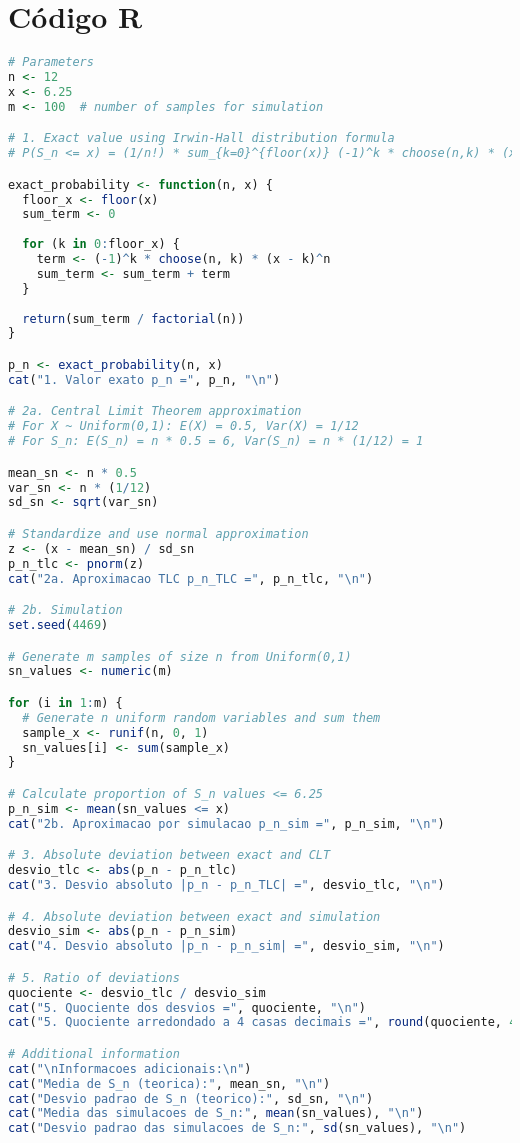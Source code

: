 \documentclass[11pt,a4paper]{article}
\begin{document}
\section*{Código R}

\begin{lstlisting}[language=R]
# Parameters
n <- 12
x <- 6.25
m <- 100  # number of samples for simulation

# 1. Exact value using Irwin-Hall distribution formula
# P(S_n <= x) = (1/n!) * sum_{k=0}^{floor(x)} (-1)^k * choose(n,k) * (x-k)^n

exact_probability <- function(n, x) {
  floor_x <- floor(x)
  sum_term <- 0
  
  for (k in 0:floor_x) {
    term <- (-1)^k * choose(n, k) * (x - k)^n
    sum_term <- sum_term + term
  }
  
  return(sum_term / factorial(n))
}

p_n <- exact_probability(n, x)
cat("1. Valor exato p_n =", p_n, "\n")

# 2a. Central Limit Theorem approximation
# For X ~ Uniform(0,1): E(X) = 0.5, Var(X) = 1/12
# For S_n: E(S_n) = n * 0.5 = 6, Var(S_n) = n * (1/12) = 1

mean_sn <- n * 0.5
var_sn <- n * (1/12)
sd_sn <- sqrt(var_sn)

# Standardize and use normal approximation
z <- (x - mean_sn) / sd_sn
p_n_tlc <- pnorm(z)
cat("2a. Aproximacao TLC p_n_TLC =", p_n_tlc, "\n")

# 2b. Simulation
set.seed(4469)

# Generate m samples of size n from Uniform(0,1)
sn_values <- numeric(m)

for (i in 1:m) {
  # Generate n uniform random variables and sum them
  sample_x <- runif(n, 0, 1)
  sn_values[i] <- sum(sample_x)
}

# Calculate proportion of S_n values <= 6.25
p_n_sim <- mean(sn_values <= x)
cat("2b. Aproximacao por simulacao p_n_sim =", p_n_sim, "\n")

# 3. Absolute deviation between exact and CLT
desvio_tlc <- abs(p_n - p_n_tlc)
cat("3. Desvio absoluto |p_n - p_n_TLC| =", desvio_tlc, "\n")

# 4. Absolute deviation between exact and simulation
desvio_sim <- abs(p_n - p_n_sim)
cat("4. Desvio absoluto |p_n - p_n_sim| =", desvio_sim, "\n")

# 5. Ratio of deviations
quociente <- desvio_tlc / desvio_sim
cat("5. Quociente dos desvios =", quociente, "\n")
cat("5. Quociente arredondado a 4 casas decimais =", round(quociente, 4), "\n")

# Additional information
cat("\nInformacoes adicionais:\n")
cat("Media de S_n (teorica):", mean_sn, "\n")
cat("Desvio padrao de S_n (teorico):", sd_sn, "\n")
cat("Media das simulacoes de S_n:", mean(sn_values), "\n")
cat("Desvio padrao das simulacoes de S_n:", sd(sn_values), "\n")
\end{lstlisting}
\end{document}
